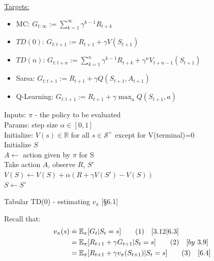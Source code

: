 \documentclass[10pt,landscape]{article}
\newcommand\numberthis{\addtocounter{equation}{1}\tag{\theequation}}
\begin{document}
\begin{multicols}{3}
\underline{Targets:}
\begin{itemize}
    \item MC: $G_{t:\infty} := \sum_{k=1}^\infty \gamma^{k-1}R_{t+k}$
    \item $TD(0)$: $G_{t:t+1} := R_{t+1} + \gamma V(S_{t+1})$
    \item $TD(n)$: $G_{t:t+n} := \sum_{k=1}^n \gamma^{k-1} R_{t+k} + \gamma^n V_{t+n-1}(S_{t+1})$ 
    \item Sarsa: $G_{t:t+1} := R_{t+1} + \gamma Q(S_{t+1}, A_{t+1})$
    \item Q-Learning: $G_{t:t+1} := R_{t+1} + \gamma \max_a Q(S_{t+1}, a)$
\end{itemize}

\begin{algorithm}[H]
Inputs: $\pi$ - the policy to be evaluated \\
Params: step size $\alpha \in [0,1]$ \\
Initialize: $V(s) \in \mathbb{R}$ for all $s \in \mathcal{S}^+$ except for V(terminal)=0 \\

{
    Initialize $S$\\
    {
    	$A \leftarrow$ action given by $\pi$ for S\\
    	Take action $A$, observe $R$, $S'$\\
    	$V(S) \leftarrow V(S) + \alpha (R + \gamma V(S') - V(S))$ \\
    	$S \leftarrow S'$   
    }
 }
\caption{Tabular TD(0) - estimating $v_{\pi}$ [§6.1]}
\end{algorithm}

Recall that:
\begin{align*}
v_{\pi}(s) & \stackrel{.}{=} \mathbb{E}_{\pi}[G_t | S_t = s]  \label{eq:v_pi_MC} \numberthis  \quad [3.12 | 6.3]\\
& = \mathbb{E}_{\pi}[R_{t+1} + \gamma G_{t+1} | S_t = s] \label{eq:v_pi_MC2}  \numberthis  \quad [by \ 3.9] \\
& = \mathbb{E}_{\pi}[R_{t+1} + \gamma v_{\pi}(S_{t+1}) | S_t = s] \label{eq:v_pi_TD} \numberthis  \quad [6.4] \\
\end{align*}


\end{multicols}
\end{document}
